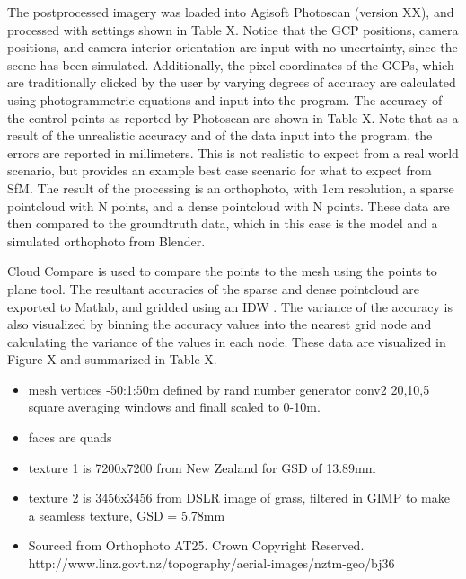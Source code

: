 The postprocessed imagery was loaded into Agisoft Photoscan (version XX), and processed with settings shown in Table X.  Notice that the GCP positions, camera positions, and camera interior orientation are input with no uncertainty, since the scene has been simulated.  Additionally, the pixel coordinates of the GCPs, which are traditionally clicked by the user by varying degrees of accuracy are calculated using photogrammetric equations and input into the program.  The accuracy of the control points as reported by Photoscan are shown in Table X.  Note that as a result of the unrealistic accuracy and of the data input into the program, the errors are reported in millimeters.  This is not realistic to expect from a real world scenario, but provides an example best case scenario for what to expect from SfM. The result of the processing is an orthophoto, with 1cm resolution, a sparse pointcloud with N points, and a dense pointcloud with N points.  These data are then compared to the groundtruth data, which in this case is the model and a simulated orthophoto from Blender.  

Cloud Compare is used to compare the points to the mesh using the points to plane tool.  The resultant accuracies of the sparse and dense pointcloud are exported to Matlab, and gridded using an IDW .  The variance of the accuracy is also visualized by binning the accuracy values into the nearest grid node and calculating the variance of the values in each node.  These data are visualized in Figure X and summarized in Table X.  

\begin{itemize}
	\item mesh vertices -50:1:50m defined by rand number generator conv2 20,10,5 square averaging windows and finall scaled to 0-10m.
	\item faces are quads
	\item texture 1 is 7200x7200 from New Zealand for GSD of 13.89mm
	\item texture 2 is 3456x3456 from DSLR image of grass, filtered in GIMP to make a seamless texture, GSD = 5.78mm
	\item Sourced from Orthophoto AT25. Crown Copyright Reserved. http://www.linz.govt.nz/topography/aerial-images/nztm-geo/bj36
	
\end{itemize}
